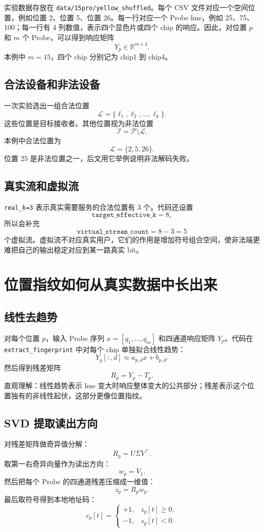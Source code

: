 \documentclass[UTF8,a4paper,11pt]{ctexart}
\begin{document}
实验数据存放在 \texttt{data/15pro/yellow\_shuffled}。每个 CSV 文件对应一个空间位置，例如位置 2、位置 5、位置 26。每一行对应一个 Probe hue，例如 25、75、100；每一行有 4 列数值，表示四个显色片或四个 chip 的响应。因此，对位置 $p$ 和 $m$ 个 Probe，可以得到响应矩阵
\[
Y_p\in\mathbb{R}^{m\times 4}.
\]
本例中 $m=15$，四个 chip 分别记为 chip1 到 chip4。

\subsection{合法设备和非法设备}

一次实验选出一组合法位置
\[
\mathcal{L}=\{\ell_1,\ell_2,\ldots,\ell_k\}.
\]
这些位置是目标接收者。其他位置视为非法位置
\[
\mathcal{I}=\mathcal{P}\setminus\mathcal{L}.
\]
本例中合法位置为
\[
\mathcal{L}=\{2,5,26\}.
\]
位置 25 是非法位置之一，后文用它举例说明非法解码失败。

\subsection{真实流和虚拟流}

\texttt{real\_k=3} 表示真实需要服务的合法位置有 3 个。代码还设置
\[
\texttt{target\_effective\_k}=8,
\]
所以会补充
\[
\texttt{virtual\_stream\_count}=8-3=5
\]
个虚拟流。虚拟流不对应真实用户，它们的作用是增加符号组合空间，使非法端更难把自己的输出稳定对应到某一路真实 bit。

\section{位置指纹如何从真实数据中长出来}

\subsection{线性去趋势}

对每个位置 $p$，输入 Probe 序列 $x=[q_1,\ldots,q_m]$ 和四通道响应矩阵 $Y_p$。代码在 \texttt{extract\_fingerprint} 中对每个 chip 单独拟合线性趋势：
\[
Y_p[:,d]\approx a_{p,d}x+b_{p,d}.
\]
然后得到残差矩阵
\[
R_p=Y_p-T_p.
\]
直观理解：线性趋势表示 hue 变大时响应整体变大的公共部分；残差表示这个位置独有的非线性起伏，这部分更像位置指纹。

\subsection{SVD 提取读出方向}

对残差矩阵做奇异值分解：
\[
R_p=U\Sigma V^\top.
\]
取第一右奇异向量作为读出方向：
\[
w_p=V_1.
\]
然后把每个 Probe 的四通道残差压缩成一维值：
\[
z_p=R_pw_p.
\]
最后取符号得到本地地址码：
\[
c_p[t]=\begin{cases}
+1,&z_p[t]\ge 0,\\
-1,&z_p[t]<0.
\end{cases}
\]
\end{document}
